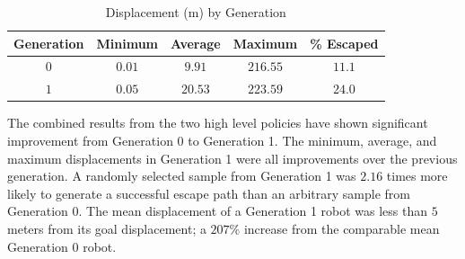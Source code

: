 \documentclass{llncs}
\begin{document}
{\begin{table}
\centering
\caption{Displacement (m) by Generation}
\begin{tabular}{|c|c|c|c|c|} \hline
Generation&Minimum&Average&Maximum&\% Escaped\\ \hline
$0$ & $0.01$ & $9.91$  & $216.55$ & $11.1$\\ \hline
$1$ & $0.05$ & $20.53$ & $223.59$ & $24.0$\\ \hline
\end{tabular}
\end{table}

The combined results from the two high level policies have shown significant improvement from Generation 0 to Generation 1. 
The minimum, average, and maximum displacements in Generation 1 were all improvements over the previous generation.
A randomly selected sample from Generation 1 was $2.16$ times more likely to generate a successful escape path than an arbitrary sample from Generation 0.
The mean displacement of a Generation 1 robot was less than $5$ meters from its goal displacement; a $207\%$ increase from the comparable mean Generation 0 robot.
}



                      
\end{document}
